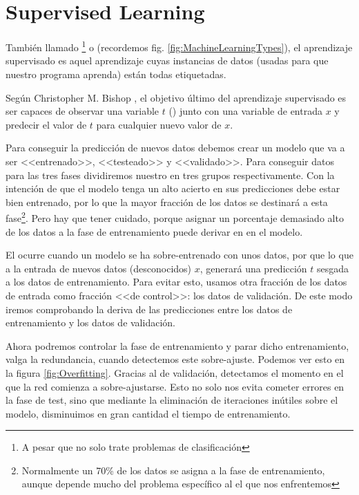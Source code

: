 
\section{Supervised Learning}

También llamado \footnote{A pesar que no solo trate problemas de clasificación} o  (recordemos fig. \ref{fig:MachineLearningTypes}), el aprendizaje supervisado es aquel aprendizaje cuyas instancias de datos (usadas para que nuestro programa aprenda) están todas etiquetadas.

Según Christopher M. Bishop \et {}, el objetivo último del aprendizaje supervisado es ser capaces de observar una variable $t$ () junto con una variable de entrada $x$ y predecir el valor de $t$ para cualquier nuevo valor de $x$.

Para conseguir la predicción de nuevos datos debemos crear un modelo que va a ser <<entrenado>>, <<testeado>> y <<validado>>. Para conseguir datos para las tres fases dividiremos nuestro  en tres grupos respectivamente. Con la intención de que el modelo tenga un alto acierto en sus predicciones debe estar bien entrenado, por lo que la mayor fracción de los datos se destinará a esta fase\footnote{Normalmente un 70\% de los datos se asigna a la fase de entrenamiento, aunque depende mucho del problema específico al el que nos enfrentemos}. Pero hay que tener cuidado, porque asignar un porcentaje demasiado alto de los datos a la fase de entrenamiento puede derivar en  en el modelo.

El  ocurre cuando un modelo se ha sobre-entrenado con unos datos, por que lo que a la entrada de nuevos datos (desconocidos) $x$, generará una predicción $t$ sesgada a los datos de entrenamiento. Para evitar esto, usamos otra fracción de los datos de entrada como fracción <<de control>>: los datos de validación. De este modo iremos comprobando la deriva de las predicciones entre los datos de entrenamiento y los datos de validación.

Ahora podremos controlar la fase de entrenamiento y parar dicho entrenamiento, valga la redundancia, cuando detectemos este sobre-ajuste. Podemos ver esto en la figura \ref{fig:Overfitting}.
Gracias al  de validación, detectamos el momento en el que la red comienza a sobre-ajustarse. Esto no solo nos evita cometer errores en la fase de test, sino que mediante la eliminación de iteraciones inútiles sobre el modelo, disminuimos en gran cantidad el tiempo de entrenamiento.


